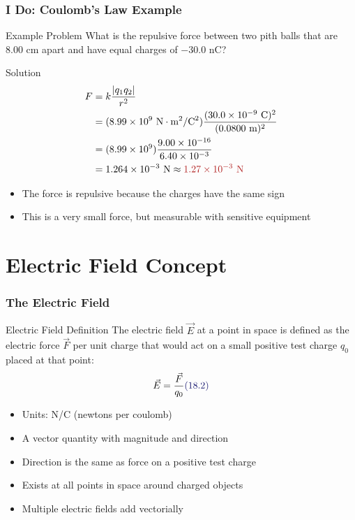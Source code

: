 \documentclass{beamer}
\newcommand{\highlight}[1]{\textcolor{ds9red}{#1}}
\newcommand{\eqnlabel}[1]{\textcolor{ds9blue}{(#1)}}
\begin{document}
    \begin{frame}
    \frametitle{I Do: Coulomb's Law Example}
    
    \begin{exampleblock}{Example Problem}
        What is the repulsive force between two pith balls that are 8.00 cm apart and have equal charges of $-30.0$ nC?
    \end{exampleblock}
    \begin{block}{Solution}
        \begin{align}
            F &= k\frac{|q_1 q_2|}{r^2}\\
            &= (8.99 \times 10^9 \text{ N}\cdot\text{m}^2/\text{C}^2) \frac{(30.0 \times 10^{-9} \text{ C})^2}{(0.0800 \text{ m})^2}\\
            &= (8.99 \times 10^9) \frac{9.00 \times 10^{-16}}{6.40 \times 10^{-3}}\\
            &= 1.264 \times 10^{-3} \text{ N} \approx \highlight{1.27 \times 10^{-3} \text{ N}}
        \end{align}
    \end{block}
    
    \begin{itemize}
        \item The force is \highlight{repulsive} because the charges have the same sign
        \item This is a very small force, but measurable with sensitive equipment
    \end{itemize}
\end{frame}

\section{Electric Field Concept}

\begin{frame}
    \frametitle{The Electric Field}
    
    \begin{block}{Electric Field Definition}
        The electric field $\vec{E}$ at a point in space is defined as the electric force $\vec{F}$ per unit charge that would act on a small positive test charge $q_0$ placed at that point:
        \begin{equation}
            \vec{E} = \frac{\vec{F}}{q_0} \eqnlabel{18.2}
        \end{equation}
    \end{block}
    
    \begin{itemize}
        \item Units: N/C (newtons per coulomb)
        \item A \highlight{vector} quantity with magnitude and direction
        \item Direction is the same as force on a \highlight{positive} test charge
        \item Exists at all points in space around charged objects
        \item Multiple electric fields \highlight{add vectorially}
    \end{itemize}
\end{frame}
\end{document}
